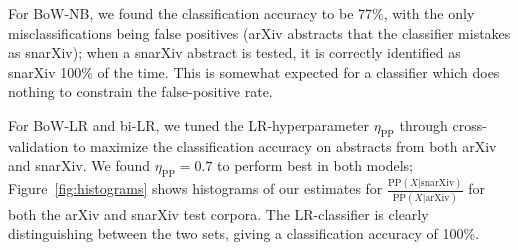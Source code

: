 \documentclass{article}
\begin{document}
For BoW-NB, we found the classification accuracy to be 77\%, with the only misclassifications being false positives (arXiv abstracts that the classifier mistakes as snarXiv); when a snarXiv abstract is tested, it is correctly identified as snarXiv 100\% of the time.
This is somewhat expected for a classifier which does nothing to constrain the false-positive rate.

For BoW-LR and bi-LR, we tuned the LR-hyperparameter $\eta_\text{PP}$ through cross-validation to maximize the classification accuracy on abstracts from both arXiv and snarXiv.
We found $\eta_{\text{PP}}=0.7$ to perform best in both models; Figure~\ref{fig:histograms} shows histograms of our estimates for $\frac{\text{PP}(X|\text{snarXiv})}{\text{PP}(X|\text{arXiv})}$ for both the arXiv and snarXiv test corpora.
The LR-classifier is clearly distinguishing between the two sets, giving a classification accuracy of 100\%.








\end{document}
